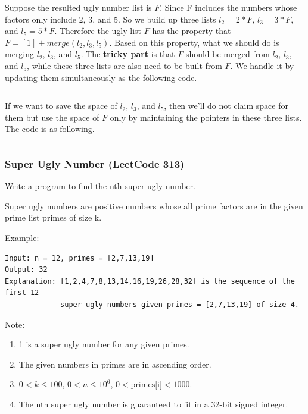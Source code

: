 \documentclass[11pt]{article}
\begin{document}
Suppose the resulted ugly number list is $F$. 
Since F includes the numbers whose factors only include 2, 3, and 5. 
So we build up three lists $l_2=2*F$, $l_3=3*F$, and $l_5=5*F$.
Therefore the ugly list $F$ has the property that $F=[1]+ merge(l_2,l_3,l_5)$.
Based on this property, what we should do is merging $l_2$, $l_3$, and $l_5$. 
The \textbf{tricky part} is that $F$ should be merged from $l_2$, $l_3$, and $l_5$, while these three lists are also need to be built from $F$.
We handle it by updating them simultaneously as the following code. 

\inputminted[breaklines=true,frame=leftline, linenos=true]{python}{src/uglyNumberII.py}

If we want to save the space of $l_2$, $l_3$, and $l_5$, then we'll do not claim space for them but use the space of $F$ only by maintaining the pointers in these three lists. The code is as following.
\inputminted[breaklines=true,frame=leftline, linenos=true]{python}{src/uglyNumberII_singleList.py}


\subsubsection{Super Ugly Number (LeetCode 313)}
Write a program to find the nth super ugly number.

Super ugly numbers are positive numbers whose all prime factors are in the given prime list primes of size k.

Example:
\begin{verbatim}
Input: n = 12, primes = [2,7,13,19]
Output: 32 
Explanation: [1,2,4,7,8,13,14,16,19,26,28,32] is the sequence of the first 12 
             super ugly numbers given primes = [2,7,13,19] of size 4.
\end{verbatim}
Note:
\begin{enumerate}
	\item 1 is a super ugly number for any given primes.
	\item The given numbers in primes are in ascending order.
	\item $0 < k \leq 100$, $0 < n \leq 10^6$, $0 < \text{primes[i]} < 1000$.
	\item The nth super ugly number is guaranteed to fit in a 32-bit signed integer.
\end{enumerate}
\end{document}
